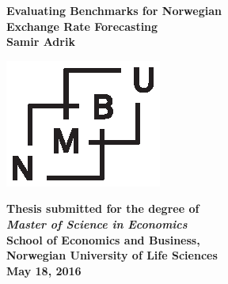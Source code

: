 \documentclass[10pt]{article}
\newcommand\blankpage{%
    \null
    \thispagestyle{empty}%
    \addtocounter{page}{-1}%
    \newpage}
\numberwithin{equation}{section}
\numberwithin{table}{section}
\numberwithin{figure}{section}
\begin{document}

\blankpage
\newpage
\small
\newpage
\afterpage{\blankpage}
\newpage
\begin{titlepage}
\begin{center}
\vspace*{0,8cm}\LARGE{\textbf{Evaluating Benchmarks for Norwegian\\ Exchange Rate Forecasting}}\\[0,4cm]

\vspace*{1,5cm}\Large{\textbf{Samir Adrik}}

\vspace*{3cm}\includegraphics[scale=1.5]{images/NMBU.eps}

\vspace{1cm}\large{\textbf{Thesis submitted for the degree of\\ \textit{Master of Science in Economics}}}\\[0,5cm]

\large{\textbf{School of Economics and Business,\\
Norwegian University of Life Sciences}}\\[0,5cm]

\large{\textbf{May 18, 2016}}
\end{center}
\end{titlepage}

\newpage
{}
\end{document}
